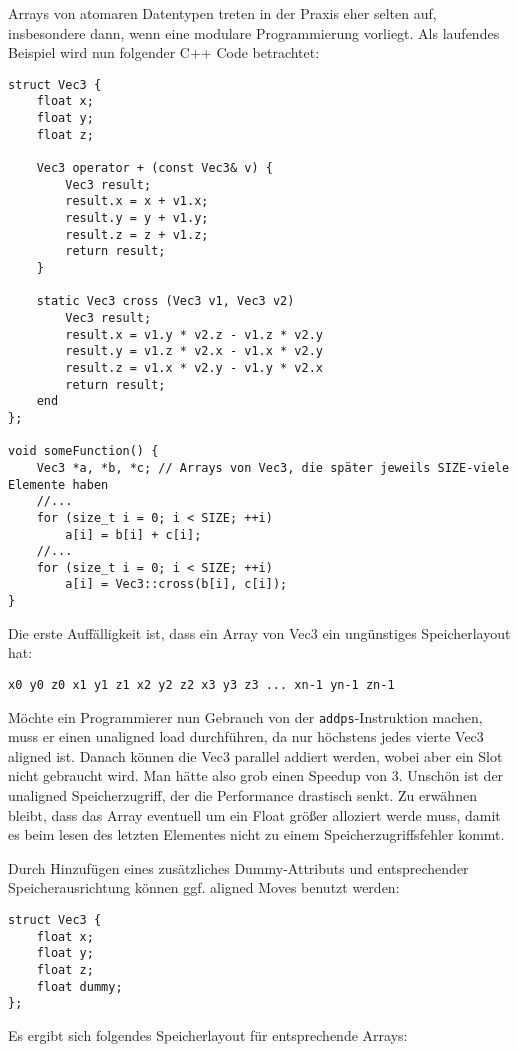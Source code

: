 \documentclass[a4paper,10pt]{article}
\begin{document}
Arrays von atomaren Datentypen treten in der Praxis eher selten auf, insbesondere dann, wenn eine
modulare Programmierung vorliegt. Als laufendes Beispiel wird nun folgender C++ Code betrachtet:

\begin{verbatim}
struct Vec3 {
    float x;
    float y;
    float z;

    Vec3 operator + (const Vec3& v) {
        Vec3 result;
        result.x = x + v1.x;
        result.y = y + v1.y;
        result.z = z + v1.z;
        return result;
    }

    static Vec3 cross (Vec3 v1, Vec3 v2)
        Vec3 result;
        result.x = v1.y * v2.z - v1.z * v2.y
        result.y = v1.z * v2.x - v1.x * v2.y
        result.z = v1.x * v2.y - v1.y * v2.x
        return result;
    end
};

void someFunction() {
    Vec3 *a, *b, *c; // Arrays von Vec3, die später jeweils SIZE-viele Elemente haben
    //...
    for (size_t i = 0; i < SIZE; ++i)
        a[i] = b[i] + c[i];
    //...
    for (size_t i = 0; i < SIZE; ++i)
        a[i] = Vec3::cross(b[i], c[i]);
}
\end{verbatim}

Die erste Auffälligkeit ist, dass ein Array von Vec3 ein ungünstiges Speicherlayout hat:

\begin{verbatim}
x0 y0 z0 x1 y1 z1 x2 y2 z2 x3 y3 z3 ... xn-1 yn-1 zn-1
\end{verbatim}

Möchte ein Programmierer nun Gebrauch von der \texttt{addps}-Instruktion machen, muss er einen
unaligned load durchführen, da nur höchstens jedes vierte Vec3 aligned ist. Danach können die Vec3
parallel addiert werden, wobei aber ein Slot nicht gebraucht wird. Man hätte also grob einen Speedup
von 3. Unschön ist der unaligned Speicherzugriff, der die Performance drastisch senkt. Zu erwähnen
bleibt, dass das Array eventuell um ein Float größer alloziert werde muss, damit es beim lesen des
letzten Elementes nicht zu einem Speicherzugriffsfehler kommt.

Durch Hinzufügen eines zusätzliches Dummy-Attributs und entsprechender Speicherausrichtung können
ggf. aligned Moves benutzt werden:

\begin{verbatim}
struct Vec3 {
    float x;
    float y;
    float z;
    float dummy;
};
\end{verbatim}

Es ergibt sich folgendes Speicherlayout für entsprechende Arrays:
\end{document}

